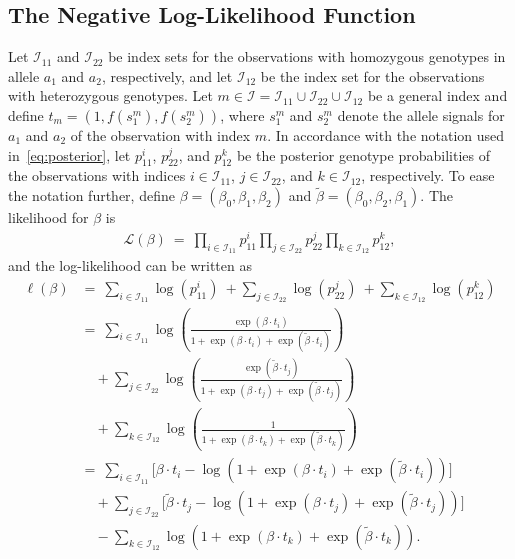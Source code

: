 \documentclass[preprint,5p,times,11pt]{elsarticle}
\begin{document}
\subsection*{The Negative Log-Likelihood Function}
Let $\mathcal{I}_{11}$ and $\mathcal{I}_{22}$ be index sets for the observations with homozygous genotypes in allele $a_1$ and $a_2$, respectively, and let $\mathcal{I}_{12}$ be the index set for the observations with heterozygous genotypes.
Let $m \in \mathcal{I} = \mathcal{I}_{11}\cup\mathcal{I}_{22}\cup\mathcal{I}_{12}$ be a general index and define $t_m = (1, f(s_1^m), f(s_2^m))$, where $s_1^m$ and $s_2^m$ denote the allele signals for $a_1$ and $a_2$ of the observation with index $m$.
In accordance with the notation used in~\eqref{eq:posterior}, let $p_{11}^i$, $p_{22}^j$, and $p_{12}^k$ be the posterior genotype probabilities of the observations with indices $i \in \mathcal{I}_{11}$, $j \in \mathcal{I}_{22}$, and $k \in \mathcal{I}_{12}$, respectively.
To ease the notation further, define $\beta = (\beta_0,\beta_1,\beta_2)$ and $\tilde\beta = (\beta_0,\beta_2,\beta_1)$.
The likelihood for $\beta$ is
\begin{align*}
\mathcal{L}\left(\beta\right) \ = \ \prod_{i\in\mathcal{I}_{11}} p_{11}^i \prod_{j\in\mathcal{I}_{22}} p_{22}^j \prod_{k\in\mathcal{I}_{12}} p_{12}^k,
\end{align*}
and the log-likelihood can be written as
\begin{align*}
\ell\left(\beta\right)
&=\ \sum_{i\in\mathcal{I}_{11}} \log\left(p_{11}^i\right)
\ + \sum_{j\in\mathcal{I}_{22}} \log\left(p_{22}^j\right)
\ + \sum_{k\in\mathcal{I}_{12}} \log\left(p_{12}^k\right) \\
&= \ \sum_{i\in\mathcal{I}_{11}} \log\left(\frac{\exp\left(\beta \cdot t_i \right)}{1 + \exp\left(\beta \cdot t_i \right) + \exp\left(\tilde{\beta} \cdot t_i \right)}\right) \\
&\quad + \sum_{j\in\mathcal{I}_{22}} \log\left(\frac{\exp\left(\tilde{\beta} \cdot t_j \right)}{1 + \exp\left(\beta \cdot t_j \right) + \exp\left(\tilde{\beta} \cdot t_j \right)}\right) \\
&\quad + \sum_{k\in\mathcal{I}_{12}} \log\left(\frac{1}{1 + \exp\left(\beta \cdot t_k \right) + \exp\left(\tilde{\beta} \cdot t_k \right)}\right) \\
&= \ \sum_{i\in\mathcal{I}_{11}} \Bigg[ \beta \cdot t_i - \log\left(1 + \exp\left(\beta \cdot t_i \right) + \exp\left(\tilde{\beta} \cdot t_i \right)\right) \Bigg] \\
&\quad + \sum_{j\in\mathcal{I}_{22}} \Bigg[ \tilde{\beta} \cdot t_j - \log\left(1 + \exp\left(\beta \cdot t_j \right) + \exp\left(\tilde{\beta} \cdot t_j \right)\right) \Bigg] \\
&\quad - \sum_{k\in\mathcal{I}_{12}} \log\left(1 + \exp\left(\beta \cdot t_k \right) + \exp\left(\tilde{\beta} \cdot t_k \right)\right).
\end{align*}
\end{document}
